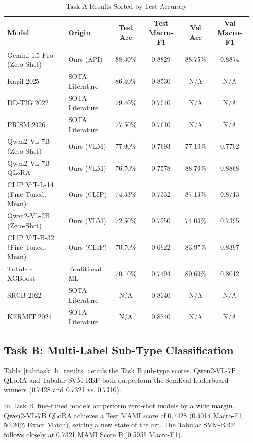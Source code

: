 \documentclass[11pt]{article}
\begin{document}
\begin{table}[h]
\centering
\small
\caption{Task A Results Sorted by Test Accuracy}
\label{tab:task_a_results}
\begin{tabular}{llcccc}
\toprule
\textbf{Model} & \textbf{Origin} & \textbf{Test Acc} & \textbf{Test Macro-F1} & \textbf{Val Acc} & \textbf{Val Macro-F1} \\
\midrule
Gemini 1.5 Pro (Zero-Shot) & Ours (API) & 88.30\% & 0.8829 & 88.75\% & 0.8874 \\
Kapil 2025 \cite{kapil2025transformer} & SOTA Literature & 86.40\% & 0.8530 & N/A & N/A \\
DD-TIG 2022 \cite{zhou2022ddtig} & SOTA Literature & 79.40\% & 0.7940 & N/A & N/A \\
PRISM 2026 \cite{zhu2026prism} & SOTA Literature & 77.50\% & 0.7610 & N/A & N/A \\
Qwen2-VL-7B (Zero-Shot) & Ours (VLM) & 77.00\% & 0.7693 & 77.10\% & 0.7702 \\
Qwen2-VL-7B QLoRA & Ours (VLM) & 76.70\% & 0.7578 & 88.70\% & 0.8868 \\
CLIP ViT-L-14 (Fine-Tuned, Mean) & Ours (CLIP) & 74.33\% & 0.7332 & 87.13\% & 0.8713 \\
Qwen2-VL-2B (Zero-Shot) & Ours (VLM) & 72.50\% & 0.7250 & 74.00\% & 0.7395 \\
CLIP ViT-B-32 (Fine-Tuned, Mean) & Ours (CLIP) & 70.70\% & 0.6922 & 83.97\% & 0.8397 \\
Tabular: XGBoost & Traditional ML & 70.10\% & 0.7494 & 80.60\% & 0.8012 \\
\midrule
SRCB 2022 \cite{zhang2022srcb} & SOTA Literature & N/A & 0.8340 & N/A & N/A \\
KERMIT 2024 \cite{grasso2024kermit} & SOTA Literature & N/A & 0.8340 & N/A & N/A \\
\bottomrule
\end{tabular}
\end{table}

\subsection{Task B: Multi-Label Sub-Type Classification}
Table~\ref{tab:task_b_results} details the Task B sub-type scores. Qwen2-VL-7B QLoRA and Tabular SVM-RBF both outperform the SemEval leaderboard winners (0.7428 and 0.7321 vs. 0.7310).

In Task B, fine-tuned models outperform zero-shot models by a wide margin. Qwen2-VL-7B QLoRA achieves a Test MAMI score of 0.7428 (0.6014 Macro-F1, 50.20\% Exact Match), setting a new state of the art. The Tabular SVM-RBF follows closely at 0.7321 MAMI Score B (0.5958 Macro-F1).
\end{document}
